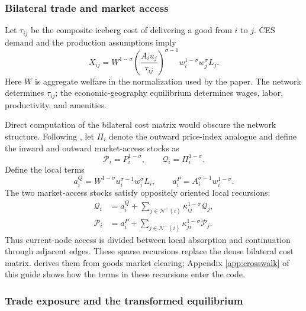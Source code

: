 \subsubsection{Bilateral trade and market access}

Let \(\tau_{ij}\) be the composite iceberg cost of delivering a good from
\(i\) to \(j\). CES demand and the production assumptions imply
\[
 X_{ij}
 =W^{1-\sigma}
 \left(\frac{A_i u_j}{\tau_{ij}}\right)^{\sigma-1}
 w_i^{1-\sigma}w_j^\sigma L_j.
\]
Here \(W\) is aggregate welfare in the normalization used by the paper. The
network determines \(\tau_{ij}\); the economic-geography equilibrium
determines wages, labor, productivity, and amenities.

Direct computation of the bilateral cost matrix would obscure the network
structure. Following \citet{AllenFuchsWong2026}, let \(\Pi_i\) denote the
outward price-index analogue and define the inward and outward market-access
stocks as
\[
  \mathcal P_i=P_i^{1-\sigma},
  \qquad
  \mathcal Q_i=\Pi_i^{1-\sigma}.
\]
Define the local terms
\[
 a_i^Q=W^{1-\sigma}u_i^{\sigma-1}w_i^\sigma L_i,
 \qquad
 a_i^P=A_i^{\sigma-1}w_i^{1-\sigma}.
\]
The two market-access stocks satisfy oppositely oriented local recursions:
\begin{align}
 \mathcal Q_i
 &=a_i^Q+\sum_{j\in\mathcal N^+(i)}
       \kappa_{ij}^{1-\sigma}\mathcal Q_j,
 \label{eq:guide-outward-access}\\
 \mathcal P_i
 &=a_i^P+\sum_{j\in\mathcal N^-(i)}
       \kappa_{ji}^{1-\sigma}\mathcal P_j.
 \label{eq:guide-inward-access}
\end{align}
Thus current-node access is divided between local absorption and continuation
through adjacent edges. These sparse recursions replace the dense bilateral
cost matrix. \citet[Appendix A]{AllenFuchsWong2026} derives them from goods
market clearing; Appendix \ref{app:crosswalk} of this guide shows how the
terms in these recursions enter the code.

\subsubsection{Trade exposure and the transformed equilibrium}

